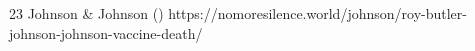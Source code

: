           {
          }
          {
            23
          }
          {
            Johnson \& Johnson
          }
          {
          }
          {
             ()
          }
          {
            https://nomoresilence.world/johnson/roy-butler-johnson-johnson-vaccine-death/
          }
